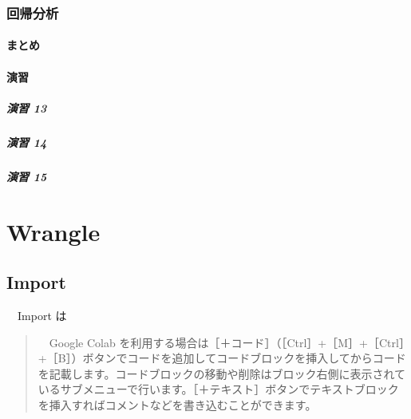 \documentclass[
  12pt,
]{book}
\begin{document}
\hypertarget{ux56deux5e30ux5206ux6790}{%
\section{回帰分析}\label{ux56deux5e30ux5206ux6790}}

\hypertarget{ux307eux3068ux3081-4}{%
\subsection{まとめ}\label{ux307eux3068ux3081-4}}

\hypertarget{ux6f14ux7fd2-13}{%
\subsection{演習}\label{ux6f14ux7fd2-13}}

\hypertarget{ux6f14ux7fd2-13-1}{%
\subsubsection*{演習 13}\label{ux6f14ux7fd2-13-1}}

\hypertarget{ux6f14ux7fd2-14}{%
\subsubsection*{演習 14}\label{ux6f14ux7fd2-14}}

\hypertarget{ux6f14ux7fd2-15}{%
\subsubsection*{演習 15}\label{ux6f14ux7fd2-15}}

\hypertarget{part-wrangle}{%
\part{Wrangle}\label{part-wrangle}}

\hypertarget{import-1}{%
\chapter{Import}\label{import-1}}

　Import は

\begin{quote}
　Google Colab を利用する場合は［＋コード］（［Ctrl］+［M］+［Ctrl］+［B］）ボタンでコードを追加してコードブロックを挿入してからコードを記載します。コードブロックの移動や削除はブロック右側に表示されているサブメニューで行います。［＋テキスト］ボタンでテキストブロックを挿入すればコメントなどを書き込むことができます。
\end{quote}
\end{document}
